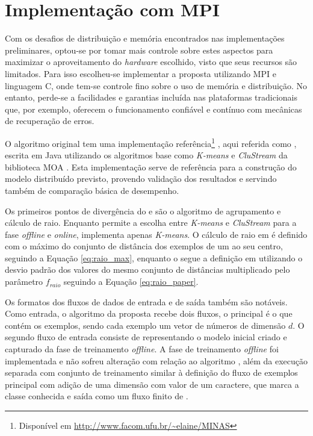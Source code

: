 
\section{Implementação com MPI}

Com os desafios de distribuição e memória encontrados nas implementações
preliminares, optou-se por tomar mais controle sobre estes aspectos para
maximizar o aproveitamento do \emph{hardware} escolhido, visto que seus recursos
são limitados.
Para isso escolheu-se implementar a proposta utilizando \acf{MPI} e linguagem C,
onde tem-se controle fino sobre o uso de memória e distribuição.
No entanto, perde-se a facilidades e garantias incluída nas plataformas
tradicionais que, por exemplo, oferecem o funcionamento confiável e contínuo com
mecânicas de recuperação de erros.

O algoritmo \minas original \cite{Faria2016minas} tem uma implementação
referência\footnote{Disponível em \url{http://www.facom.ufu.br/~elaine/MINAS}}
\cite{Faria2013source}, aqui referida como , escrita em Java utilizando
os algoritmos base como \emph{K-means} e \emph{CluStream} da biblioteca MOA
\cite{MOA}.
Esta implementação serve de referência para a construção do modelo distribuído
previsto, provendo validação dos resultados e servindo também de comparação
básica de desempenho.

Os primeiros pontos de divergência do \mfog e  são o algoritmo de
agrupamento e cálculo de raio.
Enquanto  permite a escolha entre \emph{K-means} e \emph{CluStream} para a
fase \emph{offline} e \emph{online}, \mfog implementa apenas \emph{K-means}.
O cálculo de raio em  é definido com o máximo do conjunto de distância
dos exemplos de um \mcluster ao seu centro, seguindo a Equação \ref{eq:raio_max},
enquanto o \mfog segue a definição em  utilizando o
desvio padrão dos valores do mesmo conjunto de distâncias multiplicado pelo
parâmetro $f_{raio}$ seguindo a Equação \ref{eq:raio_paper}.

\newcommand{\val}{$\vec{v}\,$\xspace}
Os formatos dos fluxos de dados de entrada e de saída também são notáveis. Como
entrada, o algoritmo da proposta recebe dois fluxos, o principal é o que contém
os exemplos, sendo cada exemplo um vetor de números de dimensão $d$.
O segundo fluxo de entrada consiste de \mclusters representando o modelo inicial
criado e capturado da fase de treinamento \emph{offline}.
A fase de treinamento \emph{offline} foi implementada e não sofreu alteração
com relação ao algoritmo \minas \cite{Faria2016minas}, além da execução separada
com conjunto de treinamento similar à definição do fluxo de exemplos principal
com adição de uma dimensão com valor de um caractere, que marca a classe conhecida
e saída como um fluxo finito de \mclusters.

